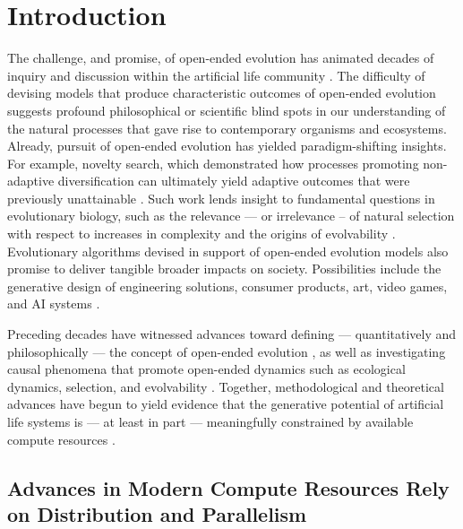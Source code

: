 \section{Introduction}

The challenge, and promise, of open-ended evolution has animated decades of inquiry and discussion within the artificial life community \citep{packard2019overview}.
The difficulty of devising models that produce characteristic outcomes of open-ended evolution suggests profound philosophical or scientific blind spots in our understanding of the natural processes that gave rise to contemporary organisms and ecosystems.
Already, pursuit of open-ended evolution has yielded paradigm-shifting insights.
For example, novelty search, which demonstrated how processes promoting non-adaptive diversification can ultimately yield adaptive outcomes that were previously unattainable \citep{lehman2011abandoning}.
Such work lends insight to fundamental questions in evolutionary biology, such as the relevance --- or irrelevance -- of natural selection with respect to increases in complexity \citep{lehman2012evolution, lynch2007frailty} and the origins of evolvability \citep{lehman2013evolvability, kirschner1998evolvability}.
Evolutionary algorithms devised in support of open-ended evolution models also promise to deliver tangible broader impacts on society.
Possibilities include the generative design of engineering solutions, consumer products, art, video games, and AI systems \citep{nguyen2015innovation, stanley2017open}.

Preceding decades have witnessed advances toward defining --- quantitatively and philosophically --- the concept of open-ended evolution \citep{lehman2012beyond, dolson2019modes, bedau1998classification}, as well as investigating causal phenomena that promote open-ended dynamics such as ecological dynamics, selection, and evolvability \citep{dolson2019constructive, soros2014identifying, huizinga2018emergence}.
Together, methodological and theoretical advances have begun to yield evidence that the generative potential of artificial life systems is --- at least in part --- meaningfully constrained by available compute resources \citep{channon2019maximum}. %

\subsection{Advances in Modern Compute Resources Rely on Distribution and Parallelism}

